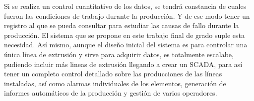 Si se realiza un control cuantitativo de los datos, se tendrá constancia de cuales fueron las condiciones de trabajo durante la producción. Y de ese modo tener un registro al que se pueda consultar para estudiar las causas de fallo durante la producción. El sistema que se propone en este trabajo final de grado suple esta necesidad. Así mismo, aunque el diseño inicial del sistema es para controlar una única línea de extrusión y sirve para adquirir datos, es totalmente escalabe, pudiendo incluir más lineas de extrusión llegando a crear un SCADA, para así tener un completo control detallado sobre las producciones de las líneas instaladas, así como alarmas individuales de los elementos, generación de informes automáticos de la producción y gestión de varios operadores. 

